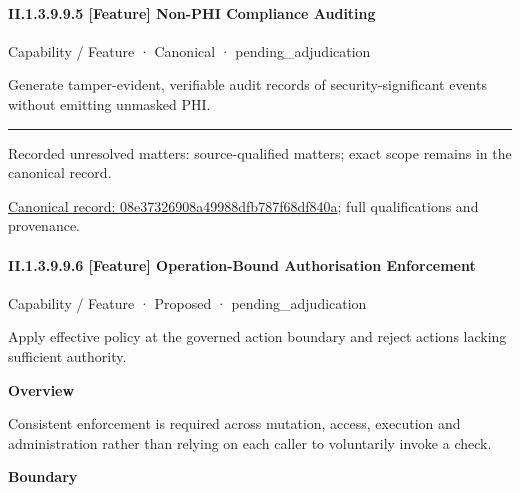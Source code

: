 \paragraph*{II.1.3.9.9.5 [Feature] Non-PHI Compliance Auditing}
\label{navigation:II.1.3.9.9.5}

\label{element:08e37326908a49988dfb787f68df840a}
{\small Capability / Feature · Canonical · pending\_adjudication}\par

Generate tamper-evident, verifiable audit records of security-significant events without emitting unmasked PHI.



\medskip\hrule\medskip

{\small Recorded unresolved matters: source-qualified matters; exact scope remains in the canonical record.}\par
{\footnotesize \href{../../../../continuum/strategy/capability/feature/08e37326908a49988dfb787f68df840a.md}{Canonical record: 08e37326908a49988dfb787f68df840a}; full qualifications and provenance.}\par
\paragraph*{II.1.3.9.9.6 [Feature] Operation-Bound Authorisation Enforcement}
\label{navigation:II.1.3.9.9.6}

\label{element:3b7dcee7d58d4d1c960dc92abd58b4c3}
{\small Capability / Feature · Proposed · pending\_adjudication}\par

Apply effective policy at the governed action boundary and reject actions lacking sufficient authority.



\textbf{Overview}



Consistent enforcement is required across mutation, access, execution and administration rather than relying on each caller to voluntarily invoke a check.



\textbf{Boundary}



